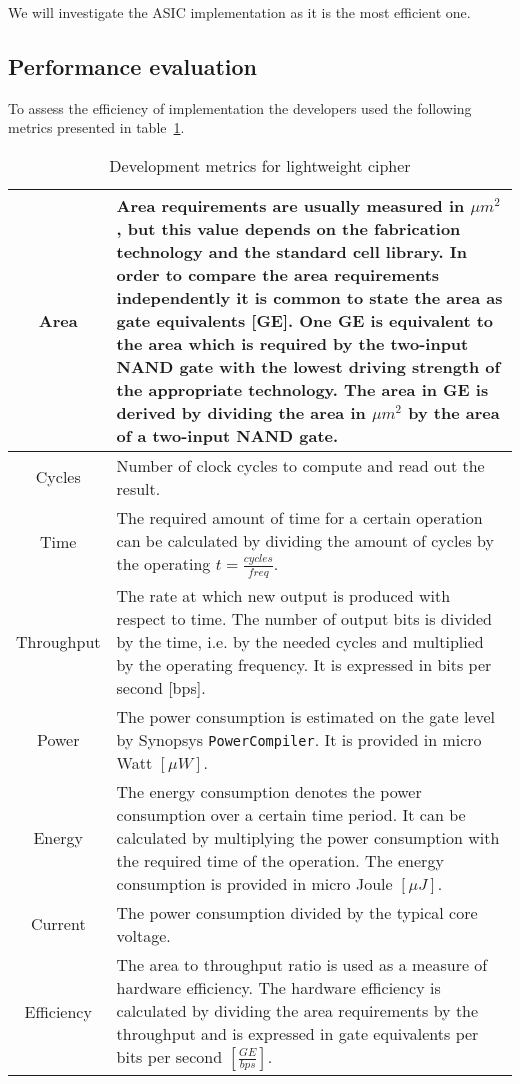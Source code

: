 We will investigate the ASIC implementation as it is the most efficient one.

\subsection{Performance evaluation}

To assess the efficiency of implementation the developers used the following
metrics presented in table~\ref{tbl:lwc-dev-metrics}.

\begin{table}[htbp]
\centering
\caption{Development metrics for lightweight cipher}
\label{tbl:lwc-dev-metrics}
\begin{tabular}{|c|p{}|} \hline
    Area &
    Area requirements are usually measured in $ \mu m^2 $ , but this
    value depends on the fabrication technology and the standard cell
    library. In order to compare the area requirements independently it is
    common to state the area as gate equivalents [GE]. One GE is equivalent
    to the area which is required by the two-input NAND gate with the
    lowest driving strength of the appropriate technology. The area in GE is
    derived by dividing the area in $ \mu m^2 $ by the area of a two-input NAND
    gate.  \\ \hline
    Cycles & 
    Number of clock cycles to compute and read out the result. \\ \hline
    Time &
    The required amount of time for a certain operation can be
    calculated by dividing the amount of cycles by the operating 
    $ t = \frac{cycles}{freq} $. \\ \hline
    Throughput &
    The rate at which new output is produced with respect to
    time. The number of output bits is divided by the time, i.e. by the
    needed cycles and multiplied by the operating frequency. It is expressed
    in bits per second [bps]. \\ \hline
    Power &
    The power consumption is estimated on the gate level by
    Synopsys \verb+PowerCompiler+. It is provided in micro Watt $ [\mu W] $. \\ \hline
    Energy &
    The energy consumption denotes the power consumption over a
    certain time period.  It can be calculated by multiplying the power
    consumption with the required time of the operation. The energy
    consumption is provided in micro Joule $ [\mu J] $. \\ \hline
    Current &
    The power consumption divided by the typical core voltage. \\ \hline
    Efficiency &
    The area to throughput ratio is used as a measure of
    hardware efficiency. The hardware efficiency is calculated by dividing
    the area requirements by the throughput and is expressed in gate
    equivalents per bits per second $ \left[ \frac{GE}{bps} \right]$. \\ \hline
\end{tabular}
\end{table}

